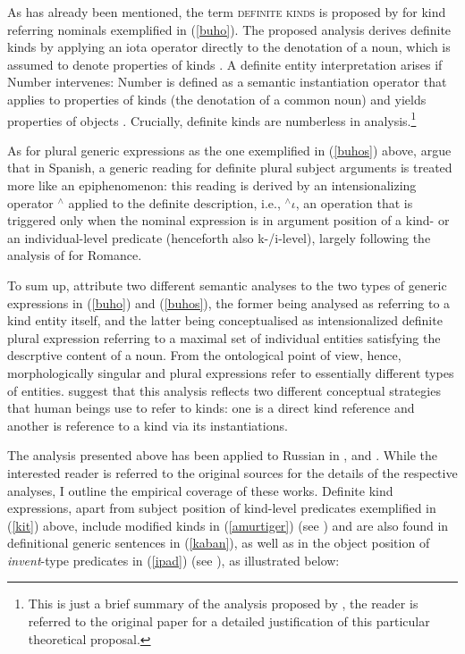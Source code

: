 \documentclass[output=paper,colorlinks,citecolor=brown]{langscibook}
\begin{document}
\noindent As has already been mentioned, the term \textsc{definite kinds} is proposed by \citet{borikespinal15} for kind referring nominals exemplified in (\ref{buho}). The proposed analysis derives definite kinds by applying an iota operator directly to the denotation of a noun, which is assumed to denote properties of kinds \citep[cf.][]{mcnallyboleda04, dobrovieoliveira08, espinal10, espinalmcnally11}. A definite entity interpretation arises if Number intervenes: Number is defined as a semantic instantiation operator that applies to properties of kinds (the denotation of a common noun) and yields properties of objects \citep[cf.][]{deprez05}. Crucially, definite kinds are numberless in  analysis.\footnote{This is just a brief summary of the analysis proposed by \citet{borikespinal15}, the reader is referred to the original paper for a detailed justification of this particular theoretical proposal.}

As for plural generic expressions as the one exemplified in (\ref{buhos}) above, \citet{borikespinal15} argue that in Spanish, a generic reading for definite plural subject arguments is treated more like an epiphenomenon: this reading is derived by an intensionalizing operator $^{\wedge}$ applied to the definite description, i.e., $^{\wedge}\iota$, an operation that is triggered only when the nominal expression is in argument position of a kind- or an individual-level predicate (henceforth also k-/i-level), largely following the analysis of \citet{chierchia98} for Romance. 

To sum up, \citet{borikespinal15} attribute two different semantic analyses to the two types of generic expressions in (\ref{buho}) and (\ref{buhos}), the former being analysed as referring to a kind entity itself, and the latter being conceptualised as intensionalized definite plural expression referring to a maximal set of individual entities satisfying the descrptive content of a noun. From the ontological point of view, hence, morphologically singular and plural expressions refer to essentially different types of entities. \citet{borikespinal15} suggest that this analysis reflects two different conceptual strategies that human beings use to refer to kinds: one is a direct kind reference and another is reference to a kind via its instantiations. 

The analysis presented above has been applied to Russian in \citet{borikespinal19}, \citet{seres20} and \citet{borikespinal20}. While the interested reader is referred to the original sources for the details of the respective analyses, I outline the empirical coverage of these works. Definite kind expressions, apart from subject position of kind-level predicates exemplified in (\ref{kit}) above, include modified kinds in (\ref{amurtiger}) (see \citealt{borikespinal19, borikespinal20}) and are also found in definitional generic sentences in (\ref{kaban}), as well as in the object position of \textit{invent}-type predicates in (\ref{ipad}) (see \citealt{seres20}), as illustrated below: 
\end{document}

